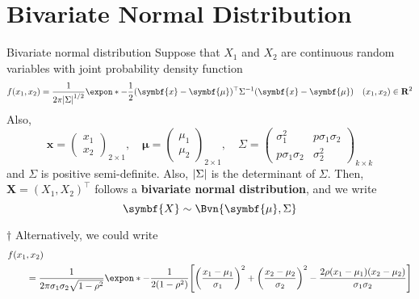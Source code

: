 \section{Bivariate Normal Distribution}
\begin{Definition}{Bivariate normal distribution}{}
    Suppose that $ X_1 $ and $ X_2 $
    are continuous random variables with joint probability
    density function
    \[ f(x_1,x_2)=\frac{1}{2\pi\abs*{\Sigma}^{1/2}}
        \expon*{-\frac{1}{2}(\symbf{x}-\symbf{\mu})^\top \Sigma^{-1}(\symbf{x}-\symbf{\mu})}\quad(x_1,x_2)\in\mathbf{R}^2     \]
    Also,
    \[ \symbf{x}=\begin{pmatrix}
            x_1 \\
            x_2
        \end{pmatrix}_{2\times 1},\quad
        \symbf{\mu}=\begin{pmatrix}
            \mu_1 \\
            \mu_2
        \end{pmatrix}_{2\times 1},\quad
        \Sigma=
        \begin{pmatrix}
            \sigma_1^2        & p\sigma_1\sigma_2 \\
            p\sigma_1\sigma_2 & \sigma_2^2
        \end{pmatrix}_{k\times k} \]
    and $ \Sigma $ is positive semi-definite. Also,
    $ \abs*{\Sigma} $ is the determinant of $ \Sigma $.
    Then, $ \symbf{X}=(X_1,X_2)^\top $ follows a \textbf{bivariate normal distribution},
    and we write
    \[ \symbf{X}\sim\Bvn{\symbf{\mu},\Sigma}  \]
\end{Definition}
\begin{Remark}{$ \dagger $}{}
    Alternatively, we could write
    \begin{align*}
        f(x_1 & ,x_2)                                          \\
              & =\frac{1}{2\pi\sigma_1\sigma_2\sqrt{1-\rho^2}}
        \expon*{-\frac{1}{2(1-\rho^2)}
            \Biggl[ \biggl( \frac{x_1-\mu_1}{\sigma_1}  \biggr)^2+
                \biggl( \frac{x_2-\mu_2}{\sigma_2}  \biggr)^2-
                \frac{2\rho(x_1-\mu_1)(x_2-\mu_2)}{\sigma_1\sigma_2} \Biggr]}
    \end{align*}
\end{Remark}
